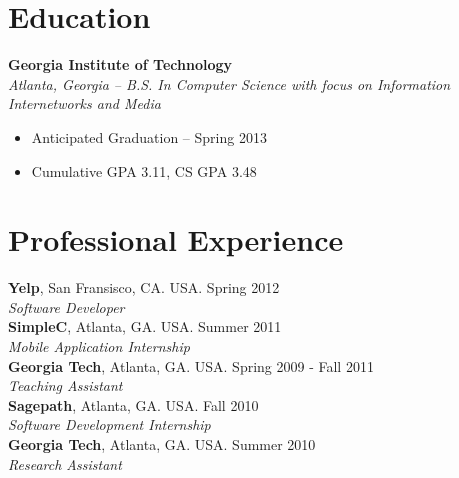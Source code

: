 \documentclass[margin,line]{res}
\begin{document}
\begin{resume}
\section{\sc Education}
    {\bf Georgia Institute of Technology}\\
    {\em Atlanta, Georgia -- B.S. In Computer Science with focus on
      Information Internetworks and Media}
    \begin{itemize}
    \item Anticipated Graduation -- Spring 2013
    \item Cumulative GPA 3.11, CS GPA 3.48
    \end{itemize}

\section{\sc Professional Experience}
    {\bf Yelp}, San Fransisco, CA. USA. \hfill{Spring 2012}\\
    {\em Software Developer}\hfill\\
    {\bf SimpleC}, Atlanta, GA. USA. \hfill{Summer 2011}\\
    {\em Mobile Application Internship} \\
    {\bf Georgia Tech}, Atlanta, GA. USA. \hfill{Spring 2009 - Fall 2011}\\
    {\em Teaching Assistant} \\
    {\bf Sagepath}, Atlanta, GA. USA. \hfill{Fall 2010}\\
    {\em Software Development Internship} \\
    {\bf Georgia Tech}, Atlanta, GA. USA. \hfill{Summer 2010}\\
    {\em Research Assistant} \\

\end{resume}
\end{document}
